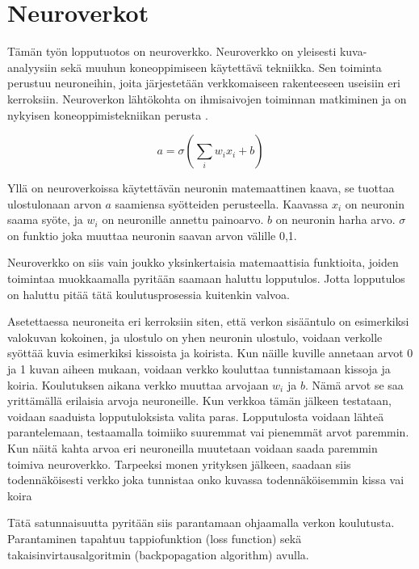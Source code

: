 \section{Neuroverkot} 

Tämän työn lopputuotos on neuroverkko.  
Neuroverkko on yleisesti kuva-analyysiin sekä muuhun koneoppimiseen käytettävä tekniikka.  
Sen toiminta perustuu neuroneihin, joita järjestetään verkkomaiseen rakenteeseen useisiin eri kerroksiin.
Neuroverkon lähtökohta on ihmisaivojen toiminnan matkiminen ja on nykyisen koneoppimistekniikan perusta \cite{PhamTrungQuang2023EotH}.

\begin{equation}\label{yht:neuroni}
    a = \sigma\left(\sum_i w_i x_i + b\right)
\end{equation}

Yllä on neuroverkoissa käytettävän neuronin matemaattinen kaava,
se tuottaa ulostulonaan arvon \(a\) saamiensa syötteiden perusteella.  
Kaavassa \(x_i\) on neuronin saama syöte, ja  
\(w_i\) on neuronille annettu painoarvo.  
\(b\) on neuronin harha arvo. \(\sigma\) on funktio joka muuttaa neuronin saavan arvon välille 0,1.

Neuroverkko on siis vain joukko yksinkertaisia matemaattisia funktioita,
joiden toimintaa muokkaamalla pyritään saamaan haluttu lopputulos.
Jotta lopputulos on haluttu pitää tätä koulutusprosessia kuitenkin valvoa.


Asetettaessa neuroneita eri kerroksiin siten, että verkon sisääntulo on esimerkiksi valokuvan kokoinen, 
ja ulostulo on yhen neuronin ulostulo, 
voidaan verkolle syöttää kuvia esimerkiksi kissoista ja koirista.
Kun näille kuville annetaan arvot 0 ja 1 kuvan aiheen mukaan, voidaan verkko kouluttaa tunnistamaan kissoja ja koiria.
Koulutuksen aikana verkko muuttaa arvojaan \(w_i\) ja \(b\).
Nämä arvot se saa yrittämällä erilaisia arvoja neuroneille.
Kun verkkoa tämän jälkeen testataan, voidaan saaduista lopputuloksista valita paras.
Lopputulosta voidaan lähteä parantelemaan, testaamalla toimiiko suuremmat vai pienemmät arvot paremmin.
Kun näitä kahta arvoa eri neuroneilla muutetaan voidaan saada paremmin toimiva neuroverkko.
Tarpeeksi monen yrityksen jälkeen, saadaan siis todennäköisesti verkko joka tunnistaa onko kuvassa todennäköisemmin kissa vai koira

Tätä satunnaisuutta pyritään siis parantamaan ohjaamalla verkon koulutusta.
Parantaminen tapahtuu tappiofunktion (loss function) sekä takaisinvirtausalgoritmin (backpopagation algorithm) avulla.

